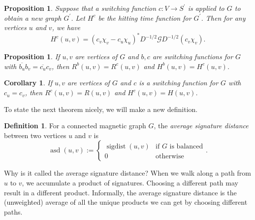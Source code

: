 \documentclass[12pt]{article}
\newtheorem{prop}[thm]{Proposition}
\newtheorem{corollary}[thm]{Corollary}
\theoremstyle{definition}
\newtheorem{defn}[thm]{Definition}
\DeclareMathOperator{\sigdist}{sigdist}
\DeclareMathOperator{\asd}{asd}
\newcommand{\green}{\mathcal{G}}
\begin{document}
\begin{prop}
Suppose that a switching function $c: V \rightarrow S^\prime$ is applied to $G$ to obtain a new graph $G^\prime$. Let $H^c$ be the hitting time function for $G^\prime$. Then for any vertices $u$ and $v$, we have $$H^c(u, v) = (c_v \chi_v - c_u \chi_u)^* D^{-1/2} \green D^{-1/2} (c_v \chi_v).$$
\end{prop}

\begin{prop}
If $u, v$ are vertices of $G$ and $b, c$ are switching functions for $G$ with $\overline{b_u}b_v = \overline{c_u}c_v$, then $R^b (u, v) = R^c (u, v)$ and $H^b (u, v) = H^c (u, v)$.
\end{prop}

\begin{corollary}
If $u, v$ are vertices of $G$ and $c$ is a switching function for $G$ with $c_u = c_v$, then $R^c (u, v) = R(u, v)$ and $H^c (u, v) = H(u, v)$.  
\end{corollary}

To state the next theorem nicely, we will make a new definition.   
\begin{defn}
For a connected magnetic graph $G$, the \textit{average signature distance} between two vertices $u$ and $v$ is
$$
\asd(u, v) := \begin{cases}
\sigdist(u, v) &\mbox{if $G$ is balanced} \\
0 &\mbox{otherwise}
\end{cases}.
$$
\end{defn}
Why is it called the average signature distance? When we walk along a path from $u$ to $v$, we accumulate a product of signatures. Choosing a different path may result in a different product. Informally, the average signature distance is the (unweighted) average of all the unique products we can get by choosing different paths.
\end{document}

